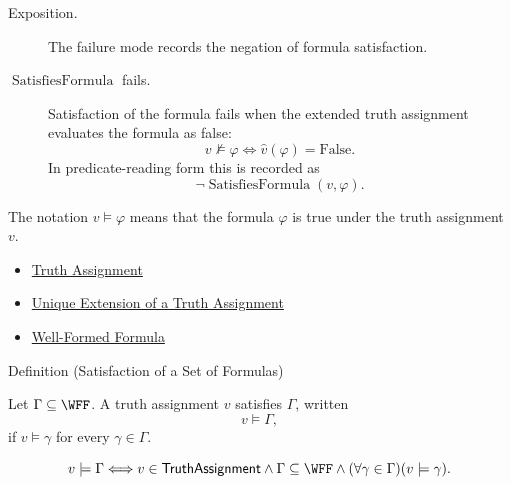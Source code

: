 \begin{remark*}
\begin{description}
  \item[Exposition.] The failure mode records the negation of formula
  satisfaction.
  \item[\(\operatorname{SatisfiesFormula}\) fails.] Satisfaction of the formula
  fails when the extended truth assignment evaluates the formula as false:
  \[
  v\not\models\varphi
  \Longleftrightarrow
  \widehat v(\varphi)=\mathrm{False}.
  \]
  In predicate-reading form this is recorded as
  \[
  \neg\operatorname{SatisfiesFormula}(v,\varphi).
  \]
\end{description}
\end{remark*}

\begin{remark*}[Interpretation]
The notation \(v\models\varphi\) means that the formula \(\varphi\) is true under the truth assignment \(v\).
\end{remark*}

\begin{dependencies}
\begin{itemize}
  \item \hyperref[def:truth-assignment-propositional-logic]{Truth Assignment}
  \item \hyperref[thm:unique-extension-truth-assignment-propositional-logic]{Unique Extension of a Truth Assignment}
  \item \hyperref[def:well-formed-formula]{Well-Formed Formula}
\end{itemize}
\end{dependencies}
\begin{definitionbox}{Definition (Satisfaction of a Set of Formulas)}
\begin{definition}
\label{def:satisfaction-set-propositional-logic}
Let \(\Gamma\subseteq\WFF\). A truth assignment \(v\) satisfies \(\Gamma\), written
\[
v\models\Gamma,
\]
if \(v\models\gamma\) for every \(\gamma\in\Gamma\).
\end{definition}
\end{definitionbox}

\begin{remark*}
\[
v\models\Gamma
\Longleftrightarrow
v\in\mathsf{TruthAssignment}
\land
\Gamma\subseteq\WFF
\land
(\forall\gamma\in\Gamma)(v\models\gamma).
\]
\end{remark*}

